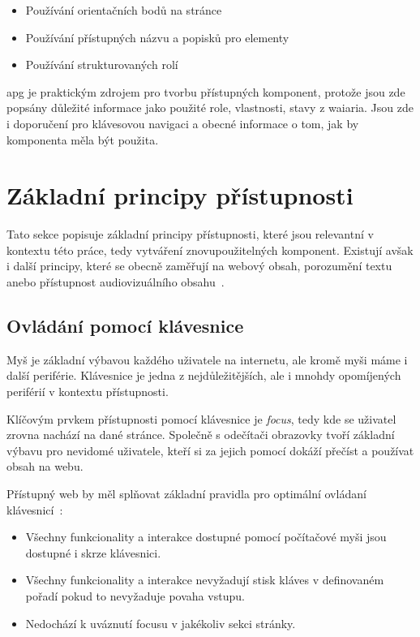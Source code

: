 \begin{itemize}
    \item Používání orientačních bodů na stránce
    \item Používání přístupných názvu a popisků pro elementy
    \item Používání strukturovaných rolí
\end{itemize}

\gls{apg} je praktickým zdrojem pro tvorbu přístupných komponent, protože jsou zde popsány důležité informace jako použité role, vlastnosti, stavy z \gls{waiaria}.
Jsou zde i doporučení pro klávesovou navigaci a obecné informace o tom, jak by komponenta měla být použita.

\section{Základní principy přístupnosti}

Tato sekce popisuje základní principy přístupnosti, které jsou relevantní v kontextu této práce, tedy vytváření znovupoužitelných komponent.
Existují avšak i další principy, které se obecně zaměřují na webový obsah, porozumění textu anebo přístupnost audiovizuálního obsahu~\cite{w3-accessibility-principles}.

\subsection{Ovládání pomocí klávesnice}

Myš je základní výbavou každého uživatele na internetu, ale kromě myši máme i další periférie.
Klávesnice je jedna z nejdůležitějších, ale i mnohdy opomíjených periférií v kontextu přístupnosti.

Klíčovým prvkem přístupnosti pomocí klávesnice je \textit{focus}, tedy kde se uživatel zrovna nachází na dané stránce.
Společně s odečítači obrazovky tvoří základní výbavu pro nevidomé uživatele, kteří si za jejich pomocí dokáží přečíst a používat obsah na webu.

Přístupný web by měl splňovat základní pravidla pro optimální ovládaní klávesnicí~\cite{wcag-keyboard}:

\begin{itemize}
    \item Všechny funkcionality a interakce dostupné pomocí počítačové myši jsou dostupné i skrze klávesnici.
    \item Všechny funkcionality a interakce nevyžadují stisk kláves v definovaném pořadí pokud to nevyžaduje povaha vstupu.
    \item Nedochází k uváznutí focusu v jakékoliv sekci stránky.
\end{itemize}

